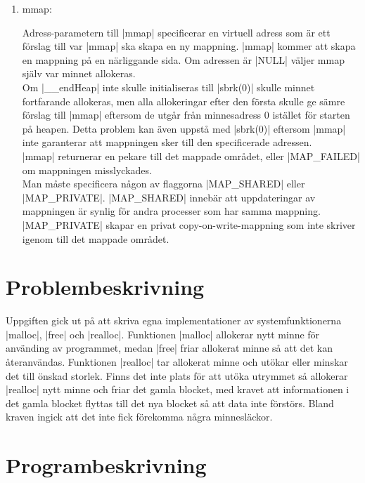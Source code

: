 \documentclass[paper=a4, fontsize=11pt]{scrartcl} %
\numberwithin{equation}{section} %
\numberwithin{figure}{section} %
\numberwithin{table}{section} %
\begin{document}
\begin{enumerate}[1)]
\item{mmap:}

Adress-parametern till |mmap| specificerar en virtuell adress som är ett
förslag till var |mmap| ska skapa en ny mappning.
|mmap| kommer att skapa en mappning på en närliggande sida.
Om adressen är |NULL| väljer mmap själv var minnet allokeras.\\

Om |__endHeap| inte skulle initialiseras till |sbrk(0)| skulle minnet fortfarande
allokeras, men alla allokeringar efter den första skulle ge sämre förslag till
|mmap| eftersom de utgår från minnesadress 0 istället för starten på heapen.
Detta problem kan även uppstå med |sbrk(0)| eftersom |mmap| inte garanterar att
mappningen sker till den specificerade adressen.\\

|mmap| returnerar en pekare till det mappade området, eller |MAP_FAILED| om
mappningen misslyckades.\\

Man måste specificera någon av flaggorna |MAP_SHARED| eller |MAP_PRIVATE|.
|MAP_SHARED| innebär att uppdateringar av mappningen är synlig för andra
processer som har samma mappning.
|MAP_PRIVATE| skapar en privat copy-on-write-mappning som inte skriver igenom
till det mappade området.
\end{enumerate}

\section{Problembeskrivning}
Uppgiften gick ut på att skriva egna implementationer av systemfunktionerna
|malloc|, |free| och |realloc|.
Funktionen |malloc| allokerar nytt minne för använding av programmet, medan
|free| friar allokerat minne så att det kan återanvändas.
Funktionen |realloc| tar allokerat minne och utökar eller minskar det till
önskad storlek.
Finns det inte plats för att utöka utrymmet så allokerar |realloc| nytt minne
och friar det gamla blocket, med kravet att informationen i det gamla blocket
flyttas till det nya blocket så att data inte förstörs.
Bland kraven ingick att det inte fick förekomma några minnesläckor.



\section{Programbeskrivning}
\end{document}
